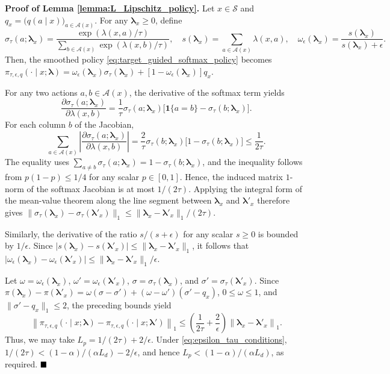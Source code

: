 \documentclass[10pt,a4paper]{amsart}
\renewenvironment{proof}[1]{\par\medskip\noindent\textbf{#1}\enspace\ignorespaces}{\par\medskip}
\providecommand{\blambda}{\boldsymbol{\lambda}}
\begin{document}
\begin{proof}{Proof of Lemma \ref{lemma:L_Lipschitz_policy}.}
Let $x\in\mathcal S$ and $q_x=\bigl(q(a\mid x)\bigr)_{a\in\mathcal A(x)}$. For any $\blambda_x \ge 0$, define
\begin{equation*}
\sigma_\tau(a;\blambda_x)
=
\frac{\exp\!\left(\lambda(x,a)/\tau\right)}
{\sum_{b\in\mathcal A(x)}\exp\!\left(\lambda(x,b)/\tau\right)},
\quad
s(\blambda_x)=\sum_{a\in\mathcal A(x)}\lambda(x,a),
\quad
\omega_\epsilon(\blambda_x)=\frac{s(\blambda_x)}{s(\blambda_x)+\epsilon}.
\end{equation*}
Then, the smoothed policy \eqref{eq:target_guided_softmax_policy} becomes
$\pi_{\tau,\epsilon,q}(\cdot\mid x;\blambda)
=\omega_\epsilon(\blambda_x)\sigma_\tau(\blambda_x)
+[1-\omega_\epsilon(\blambda_x)]q_x$.

For any two actions $a,b\in\mathcal A(x)$, the derivative of the softmax term yields
\begin{equation*}
\frac{\partial\sigma_\tau(a;\blambda_x)}
{\partial\lambda(x,b)}
=
\frac{1}{\tau}\sigma_\tau(a;\blambda_x)
\bigl[\mathbf 1\{a=b\}-\sigma_\tau(b;\blambda_x)\bigr].
\end{equation*}
For each column $b$ of the Jacobian,
\begin{equation*}
\sum_{a\in\mathcal A(x)}
\left|
\frac{\partial\sigma_\tau(a;\blambda_x)}
{\partial\lambda(x,b)}
\right|
=
\frac{2}{\tau}\sigma_\tau(b;\blambda_x)
\bigl[1-\sigma_\tau(b;\blambda_x)\bigr]
\leq
\frac{1}{2\tau}.
\end{equation*}
The equality uses
$\sum_{a\neq b}\sigma_\tau(a;\blambda_x)
=1-\sigma_\tau(b;\blambda_x)$, and the inequality follows from
$p(1-p)\leq1/4$ for any scalar $p\in[0,1]$. Hence, the induced matrix $1$-norm of
the softmax Jacobian is at most $1/(2\tau)$. Applying the integral form
of the mean-value theorem along the line segment between $\blambda_x$
and $\blambda'_x$ therefore gives
$\|\sigma_\tau(\blambda_x)-\sigma_\tau(\blambda'_x)\|_1
\leq\|\blambda_x-\blambda'_x\|_1/(2\tau)$.

Similarly, the derivative of the ratio $s/(s+\epsilon)$ for any scalar $s\geq0$ is bounded by
$1/\epsilon$. Since
$|s(\blambda_x)-s(\blambda'_x)|
\leq\|\blambda_x-\blambda'_x\|_1$, it follows that
$|\omega_\epsilon(\blambda_x)-\omega_\epsilon(\blambda'_x)|
\leq\|\blambda_x-\blambda'_x\|_1/\epsilon$.

Let $\omega=\omega_\epsilon(\blambda_x)$,
$\omega'=\omega_\epsilon(\blambda'_x)$,
$\sigma=\sigma_\tau(\blambda_x)$, and
$\sigma'=\sigma_\tau(\blambda'_x)$. Since
$\pi(\blambda_x)-\pi(\blambda'_x)
=\omega(\sigma-\sigma')+(\omega-\omega')(\sigma'-q_x)$,
$0\leq\omega\leq1$, and $\|\sigma'-q_x\|_1\leq2$, the preceding
bounds yield
\begin{equation*}
\left\|
\pi_{\tau,\epsilon,q}(\cdot\mid x;\blambda)
-\pi_{\tau,\epsilon,q}(\cdot\mid x;\blambda')
\right\|_1
\leq
\left(\frac{1}{2\tau}+\frac{2}{\epsilon}\right)
\left\|\blambda_x-\blambda'_x\right\|_1.
\end{equation*}
Thus, we may take $L_p=1/(2\tau)+2/\epsilon$. Under
\eqref{eq:epsilon_tau_conditions},
$1/(2\tau)< (1-\alpha)/(\alpha L_d)-2/\epsilon$, and hence
$L_p<(1-\alpha)/(\alpha L_d)$, as required.
$\hfill \blacksquare$
\end{proof}
\end{document}
